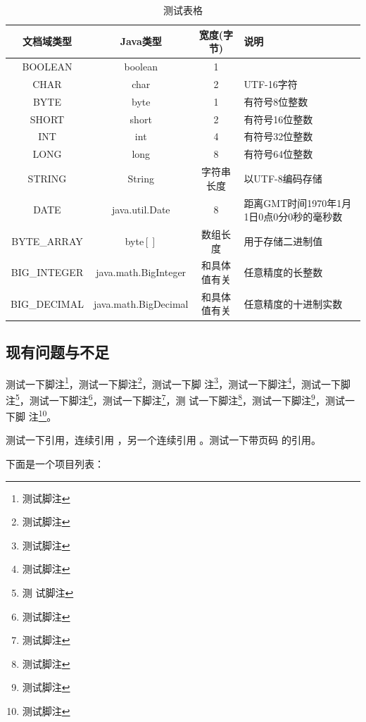 \begin{table}
  \centering
  \begin{tabular}{cccp{38mm}}
    \toprule
    \textbf{文档域类型} & \textbf{Java类型} & \textbf{宽度(字节)} & \textbf{说明} \\
    \midrule
    BOOLEAN  & boolean &  1  & \\
    CHAR     & char    &  2  & UTF-16字符 \\
    BYTE     & byte    &  1  & 有符号8位整数 \\
    SHORT    & short   &  2  & 有符号16位整数 \\
    INT      & int     &  4  & 有符号32位整数 \\
    LONG     & long    &  8  & 有符号64位整数 \\
    STRING   & String  &  字符串长度  & 以UTF-8编码存储 \\
    DATE     & java.util.Date & 8 & 距离GMT时间1970年1月1日0点0分0秒的毫秒数 \\
    BYTE\_ARRAY & byte$[]$ & 数组长度 & 用于存储二进制值 \\
    BIG\_INTEGER & java.math.BigInteger & 和具体值有关 & 任意精度的长整数 \\
    BIG\_DECIMAL & java.math.BigDecimal & 和具体值有关 & 任意精度的十进制实数 \\
    \bottomrule
  \end{tabular}
  \caption{测试表格}\label{table:test1}
\end{table}


\subsection{现有问题与不足}

测试一下脚注\footnote{测试脚注}，测试一下脚注\footnote{测试脚注}，测试一下脚
注\footnote{测试脚注}，测试一下脚注\footnote{测试脚注}，测试一下脚注\footnote{测
  试脚注}，测试一下脚注\footnote{测试脚注}，测试一下脚注\footnote{测试脚注}，测
试一下脚注\footnote{测试脚注}，测试一下脚注\footnote{测试脚注}，测试一下脚
注\footnote{测试脚注}。

测试一下引用\cite{newman2006structure}，连续引用
\cite{newman2001random,aiello2000random,bollobas2001random}，另一个连续引用
\cite{newman2001random,bollobas2001random,barabasi1999emergence}。测试一下带页码
的引用\cite[124--128]{erdHos1961strength}。

下面是一个项目列表：

